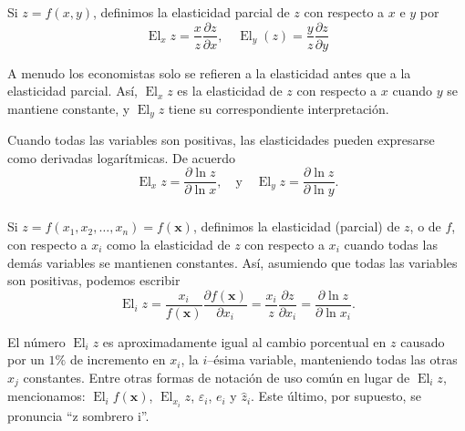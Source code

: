 \begin{frame}
\frametitle{\subsecname}

\begin{definition}
Si $z=f\left(x,y\right)$, definimos la elasticidad parcial de $z$ con respecto a $x$ e $y$ por
\begin{equation}
\operatorname{El}_{x}z=\frac{x}{z}\frac{\partial z}{\partial x},\quad\operatorname{El}_{y}\left(z\right)=\frac{y}{z}\frac{\partial z}{\partial y}
\end{equation}
\end{definition}

A menudo los economistas solo se refieren a la elasticidad antes que a la elasticidad parcial. Así, $\operatorname{El}_{x}z$ es la elasticidad de $z$ con respecto a $x$ cuando $y$ se mantiene constante, y $\operatorname{El}_{y}z$ tiene su correspondiente interpretación.

Cuando todas las variables son positivas, las elasticidades pueden expresarse como derivadas logarítmicas. De acuerdo
\begin{equation}
\operatorname{El}_{x}z=\frac{\partial\ln z}{\partial\ln x},\quad\text{y}\quad\operatorname{El}_{y}z=\frac{\partial\ln z}{\partial\ln y}.
\end{equation}
\end{frame}

\begin{frame}
	\frametitle{\subsecname}
\begin{definition}
Si $z=f\left(x_{1},x_{2},\ldots,x_{n}\right)=f\left(\bm{x}\right)$, definimos la elasticidad (parcial) de $z$, o de $f$, con respecto a $x_{i}$ como la elasticidad de $z$ con respecto a $x_{i}$ cuando todas las demás variables se mantienen constantes. Así, asumiendo que todas las variables son positivas, podemos escribir
\begin{equation}
\operatorname{El}_{i}z=\frac{x_{i}}{f\left(\bm{x}\right)}\frac{\partial f\left(\bm{x}\right)}{\partial x_{i}}=\frac{x_{i}}{z}\frac{\partial z}{\partial x_{i}}=\frac{\partial\ln z}{\partial\ln x_{i}}.
\end{equation}
\end{definition}

El número $\operatorname{El}_{i}z$ es aproximadamente igual al cambio porcentual en $z$ causado por un $1\%$ de incremento en $x_{i}$, la $i$--ésima variable, manteniendo todas las otras $x_{j}$ constantes. Entre otras formas de notación de uso común en lugar de $\operatorname{El}_{i}z$, mencionamos: $\operatorname{El}_{i}f\left(\bm{x}\right)$, $\operatorname{El}_{x_{i}}z$, $\varepsilon_{i}$, $e_{i}$ y $\hat{z}_{i}$. Este último, por supuesto, se pronuncia ``z sombrero i''.

\end{frame}

